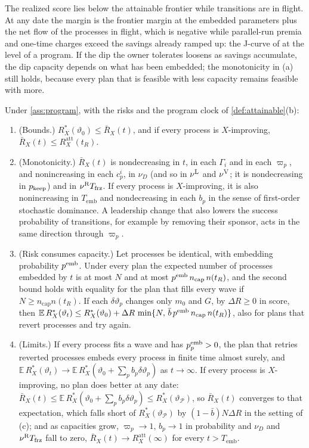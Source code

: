 The realized score lies below the attainable frontier while transitions are in flight. At any date the margin is the frontier margin at the embedded parameters plus the net flow of the processes in flight, which is negative while parallel-run premia and one-time charges exceed the savings already ramped up: the J-curve of \citet{brynjolfsson2021productivity} at the level of a program. If the dip the owner tolerates loosens as savings accumulate, the dip capacity depends on what has been embedded; the monotonicity in (a) still holds, because every plan that is feasible with less capacity remains feasible with more.

\begin{proposition}\label{prop:expected}
Under \autoref{ass:program}, with the risks and the program clock of \autoref{def:attainable}(b):
\begin{enumerate}
\item[(a)] (Bounds.) $R^*_X(\vartheta_0)\le\bar R_X(t)$, and if every process is $X$-improving, $\bar R_X(t)\le R^{\mathrm{att}}_X(t_R)$.
\item[(b)] (Monotonicity.) $\bar R_X(t)$ is nondecreasing in $t$, in each $\Gamma_i$ and in each $\varpi_p$, and nonincreasing in each $c^i_p$, in $\nu_D$ (and so in $\nu^{\rm L}$ and $\nu^{\rm V}$; it is nondecreasing in $p_{\rm keep}$) and in $\nu^{\rm R}T_{\rm frz}$. If every process is $X$-improving, it is also nonincreasing in $T_{\mathrm{emb}}$ and nondecreasing in each $b_p$ in the sense of first-order stochastic dominance. A leadership change that also lowers the success probability of transitions, for example by removing their sponsor, acts in the same direction through $\varpi_p$.
\item[(c)] (Risk consumes capacity.) Let processes be identical, with embedding probability $p^{\rm emb}$. Under every plan the expected number of processes embedded by $t$ is at most $N$ and at most $p^{\rm emb}\,n_{\mathrm{cap}}\,n(t_R)$, and the second bound holds with equality for the plan that fills every wave if $N\ge n_{\mathrm{cap}}n(t_R)$. If each $\delta\vartheta_p$ changes only $m_0$ and $G$, by $\Delta R\ge0$ in score, then $\mathbb E\,R^*_X(\vartheta_t)\le R^*_X(\vartheta_0)+\Delta R\,\min\{N,\,\bar b\,p^{\rm emb}\,n_{\mathrm{cap}}\,n(t_R)\}$, also for plans that revert processes and try again.
\item[(d)] (Limits.) If every process fits a wave and has $p^{\rm emb}_p>0$, the plan that retries reverted processes embeds every process in finite time almost surely, and $\mathbb E\,R^*_X(\vartheta_t)\to\mathbb E\,R^*_X(\vartheta_0+\sum_pb_p\delta\vartheta_p)$ as $t\to\infty$. If every process is $X$-improving, no plan does better at any date: $\bar R_X(t)\le\mathbb E\,R^*_X(\vartheta_0+\sum_pb_p\delta\vartheta_p)\le R^*_X(\vartheta_{\mathcal P})$, so $\bar R_X(t)$ converges to that expectation, which falls short of $R^*_X(\vartheta_{\mathcal P})$ by $(1-\bar b)N\Delta R$ in the setting of (c); and as capacities grow, $\varpi_p\to1$, $b_p\to1$ in probability and $\nu_D$ and $\nu^{\rm R}T_{\rm frz}$ fall to zero, $\bar R_X(t)\to R^{\mathrm{att}}_X(\infty)$ for every $t>T_{\mathrm{emb}}$.

\end{enumerate}
\end{proposition}
